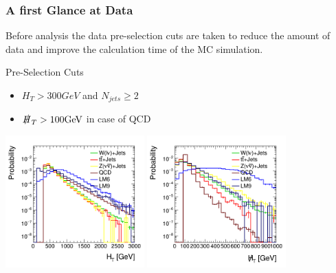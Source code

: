 

\begin{frame}
	\frametitle{A first Glance at Data}
	Before analysis the data pre-selection cuts are taken to reduce the amount of data and improve the calculation time of the MC simulation. 
	\begin{block}{Pre-Selection Cuts}
		\begin{itemize}
			\item  $H_T > 300\si{GeV}$ and $N_{\si{jets}} \geq 2$
			\item  $\slashed{H}_T > 100\si{GeV}$ in case of QCD
		\end{itemize}
	\end{block}
	
	\begin{center}
		\includegraphics[width = 0.4\textwidth]{plots10/hHt.png}
		\includegraphics[width = 0.4\textwidth]{plots10/hMht.png}
	\end{center}

\end{frame}

